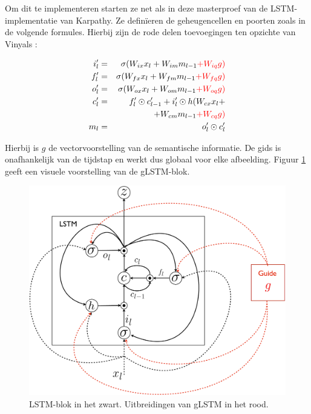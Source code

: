 Om dit te implementeren starten ze net als in deze masterproef van de LSTM-implementatie van Karpathy. Ze defin\"ieren de geheugencellen en poorten zoals in de volgende formules. Hierbij zijn de rode delen toevoegingen ten opzichte van Vinyals :

%
\begin{eqnarray}
\vspace{-3mm}
\label{glstm-memory-start}
i_l' & = & \sigma (W_{ix} x_l + W_{im} m_{l-1} \color{red}{+ W_{iq} g}) \label{glstm-input} \\
f_l' & = & \sigma (W_{fx} x_l + W_{fm} m_{l-1} \color{red}{+ W_{fq} g}) \\
o_l' & = & \sigma (W_{ox} x_l + W_{om} m_{l-1} \color{red}{+ W_{oq} g}) \\
c_l' & = & f_l' \odot c_{l-1}' + i_l' \odot h(W_{cx} x_l + \nonumber \\
&   & + W_{cm} m_{l-1} \color{red}{+ W_{cq} g}) \\
m_l & = & o_l' \odot c_l'
\label{glstm-memory}
\vspace{-3mm}
\end{eqnarray}

Hierbij is $g$ de vectorvoorstelling van de semantische informatie. De gids is onafhankelijk van de tijdstap en werkt dus globaal voor elke afbeelding. Figuur \ref{fig:glstm} geeft een visuele voorstelling van de gLSTM-blok.

\begin{figure}[tb][h]
	\centering
	\includegraphics[width=\linewidth]{Images/glstm.pdf}
	\caption{LSTM-blok in het zwart. Uitbreidingen van gLSTM in het rood.}
	\label{fig:glstm}
\end{figure}

